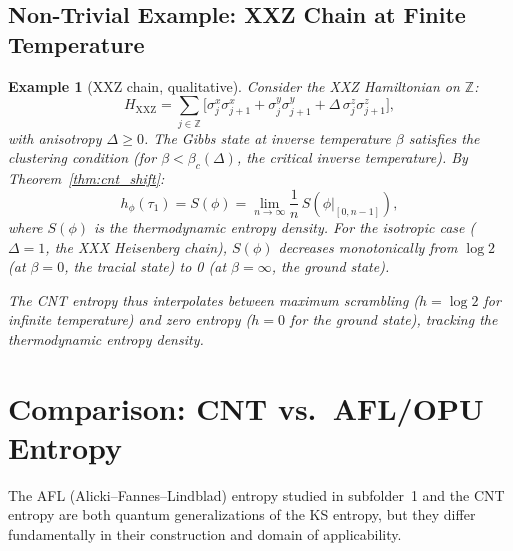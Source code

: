 \documentclass[12pt,a4paper]{article}
\newtheorem{example}[theorem]{Example}
\newcommand{\ZZ}{\mathbb{Z}}
\begin{document}
\subsection{Non-Trivial Example: XXZ Chain at Finite Temperature}

\begin{example}[XXZ chain, qualitative]\label{ex:xxz}
Consider the XXZ Hamiltonian on $\ZZ$:
\begin{equation}\label{eq:xxz}
  H_{\mathrm{XXZ}} = \sum_{j\in\ZZ}\bigl[
    \sigma_j^x\sigma_{j+1}^x + \sigma_j^y\sigma_{j+1}^y
    + \Delta\,\sigma_j^z\sigma_{j+1}^z
  \bigr],
\end{equation}
with anisotropy $\Delta\ge 0$.  The Gibbs state at inverse temperature $\beta$ satisfies
the clustering condition (for $\beta<\beta_c(\Delta)$, the critical inverse temperature).
By Theorem~\ref{thm:cnt_shift}:
\begin{equation}
  h_\phi(\tau_1) = S(\phi) = \lim_{n\to\infty}\frac{1}{n}\,S(\phi|_{[0,n-1]}),
\end{equation}
where $S(\phi)$ is the thermodynamic entropy density.  For the isotropic case ($\Delta=1$,
the XXX Heisenberg chain), $S(\phi)$ decreases monotonically from $\log 2$ (at $\beta=0$,
the tracial state) to 0 (at $\beta=\infty$, the ground state).

The CNT entropy thus interpolates between maximum scrambling ($h=\log 2$ for infinite temperature)
and zero entropy ($h=0$ for the ground state), tracking the thermodynamic entropy density.
\end{example}

\section{Comparison: CNT vs.\ AFL/OPU Entropy}
\label{sec:comparison}

The AFL (Alicki--Fannes--Lindblad) entropy studied in subfolder~1 and the CNT entropy
are both quantum generalizations of the KS entropy, but they differ fundamentally
in their construction and domain of applicability.
\end{document}
